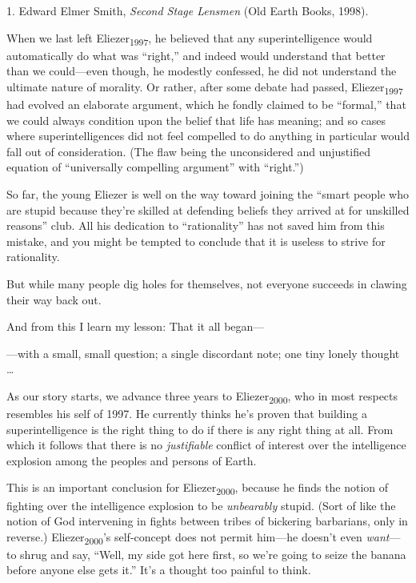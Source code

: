 {
 1. Edward Elmer Smith, \textit{Second Stage Lensmen} (Old Earth
Books, 1998).}


{
 When we last left Eliezer\textsubscript{1997}, he believed that
any superintelligence would automatically do what was
``right,'' and indeed would
understand that better than we could---even though, he modestly
confessed, he did not understand the ultimate nature of morality. Or
rather, after some debate had passed, Eliezer\textsubscript{1997} had
evolved an elaborate argument, which he fondly claimed to be
``formal,'' that we could always
condition upon the belief that life has meaning; and so cases where
superintelligences did not feel compelled to do anything in particular
would fall out of consideration. (The flaw being the unconsidered and
unjustified equation of ``universally compelling
argument'' with
``right.'') }

{
 So far, the young Eliezer is well on the way toward joining the
``smart people who are stupid because
they're skilled at defending beliefs they arrived at
for unskilled reasons'' club. All his dedication to
``rationality'' has not saved him
from this mistake, and you might be tempted to conclude that it is
useless to strive for rationality.}

{
 But while many people dig holes for themselves, not everyone
succeeds in clawing their way back out.}

{
 And from this I learn my lesson: That it all began---}

{
 {}---with a small, small question; a single discordant note; one
tiny lonely thought \ldots}

{
 As our story starts, we advance three years to
Eliezer\textsubscript{2000}, who in most respects resembles his self of
1997. He currently thinks he's proven that building a
superintelligence is the right thing to do if there is any right thing
at all. From which it follows that there is no \textit{justifiable}
conflict of interest over the intelligence explosion among the peoples
and persons of Earth.}

{
 This is an important conclusion for Eliezer\textsubscript{2000},
because he finds the notion of fighting over the intelligence explosion
to be \textit{unbearably} stupid. (Sort of like the notion of God
intervening in fights between tribes of bickering barbarians, only in
reverse.) Eliezer\textsubscript{2000}'s self-concept
does not permit him---he doesn't even
\textit{want}{}---to shrug and say, ``Well, my side
got here first, so we're going to seize the banana
before anyone else gets it.'' It's a
thought too painful to think.}

